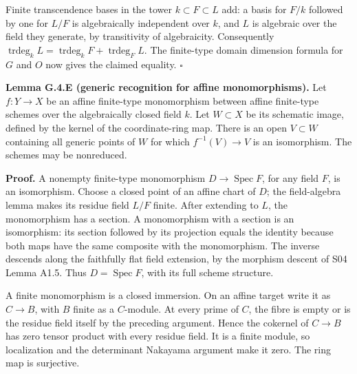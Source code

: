 \documentclass[11pt,a4paper,openany]{report}
\newcounter{none}
\begin{document}
Finite transcendence bases in the tower \(k\subset F\subset L\) add: a basis for \(F/k\) followed by one for \(L/F\) is algebraically independent over \(k\), and \(L\) is algebraic over the field they generate, by transitivity of algebraicity. Consequently \(\operatorname{trdeg}_kL=\operatorname{trdeg}_kF+\operatorname{trdeg}_FL\). The finite-type domain dimension formula for \(G\) and \(O\) now gives the claimed equality. \(\square\)

\textbf{Lemma G.4.E (generic recognition for affine monomorphisms).} Let \(f:Y\to X\) be an affine finite-type monomorphism between affine finite-type schemes over the algebraically closed field \(k\). Let \(W\subset X\) be its schematic image, defined by the kernel of the coordinate-ring map. There is an open \(V\subset W\) containing all generic points of \(W\) for which \(f^{-1}(V)\to V\) is an isomorphism. The schemes may be nonreduced.

\textbf{Proof.} A nonempty finite-type monomorphism \(D\to\operatorname{Spec}F\), for any field \(F\), is an isomorphism. Choose a closed point of an affine chart of \(D\); the field-algebra lemma makes its residue field \(L/F\) finite. After extending to \(L\), the monomorphism has a section. A monomorphism with a section is an isomorphism: its section followed by its projection equals the identity because both maps have the same composite with the monomorphism. The inverse descends along the faithfully flat field extension, by the morphism descent of S04 Lemma A1.5. Thus \(D=\operatorname{Spec}F\), with its full scheme structure.

A finite monomorphism is a closed immersion. On an affine target write it as \(C\to B\), with \(B\) finite as a \(C\)-module. At every prime of \(C\), the fibre is empty or is the residue field itself by the preceding argument. Hence the cokernel of \(C\to B\) has zero tensor product with every residue field. It is a finite module, so localization and the determinant Nakayama argument make it zero. The ring map is surjective.
\end{document}
